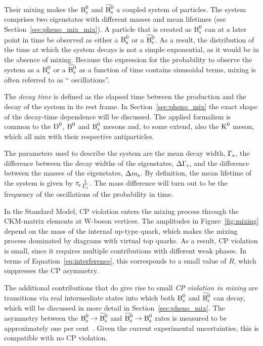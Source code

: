 Their mixing makes the $\text{B}_\text{s}^\text{0}$ and $\Bsbar$ a coupled system of particles. The system comprises two eigenstates with different masses and
mean lifetimes (see Section~\ref{sec:pheno_mix_mix}). A particle that is created as $\text{B}_\text{s}^\text{0}$ can at a later point in time be observed as
either a $\text{B}_\text{s}^\text{0}$ or a $\Bsbar$. As a result, the distribution of the time at which the \BsBsbar{} system decays is not a simple exponential,
as it would be in the absence of mixing. Because the expression for the probability to observe the system as a $\text{B}_\text{s}^\text{0}$ or a $\Bsbar$ as a
function of time contains sinusoidal terms, mixing is often referred to as ``\BsBsbar{} oscillations''.

The \emph{decay time} is defined as the elapsed time between the production and the decay of the \BsBsbar{} system in its rest frame. In
Section~\ref{sec:pheno_mix} the exact shape of the decay-time dependence will be discussed. The applied formalism is common to the $\text{D}^\text{0}$,
$\text{B}^\text{0}$ and $\text{B}_\text{s}^\text{0}$ mesons and, to some extend, also the $\text{K}^\text{0}$ meson, which all mix with their respective antiparticles.

The parameters used to describe the \BsBsbar{} system are the mean decay width, $\Gamma_\text{s}$, the difference between the decay widths of the
eigenstates, $\Delta\Gamma_\text{s}$, and the difference between the masses of the eigenstates, $\Delta m_\text{s}$. By definition, the mean lifetime of the system is
given by $\tau_\text{s}$\textequiv$\frac{\text{1}}{\Gamma_\text{s}}$. The mass difference will turn out to be the frequency of the oscillations of the
\BsBsbar{} probability in time.

In the Standard Model, CP violation enters the mixing process through the CKM-matrix elements at W-boson vertices. The amplitudes in
Figure~\ref{fig:mixing} depend on the mass of the internal up-type quark, which makes the \BsBsbar{} mixing process dominated by diagrams
with virtual top quarks. As a result, CP violation is small, since it requires multiple contributions with different weak phases. In terms
of Equation~\ref{eq:interference}, this corresponds to a small value of $R$, which suppresses the CP asymmetry.

The additional contributions that do give rise to small \emph{CP violation in mixing} are transitions via real intermediate states into
which both $\text{B}_\text{s}^\text{0}$ and $\Bsbar$ can decay, which will be discussed in more detail in Section~\ref{sec:pheno_mix}. The asymmetry between the
$\Bs\to\Bsbar$ and $\Bsbar\to\Bs$ rates is measured to be approximately one per cent~\cite{Amhis:2012bh}. Given the current experimental
uncertainties, this is compatible with no CP violation.


